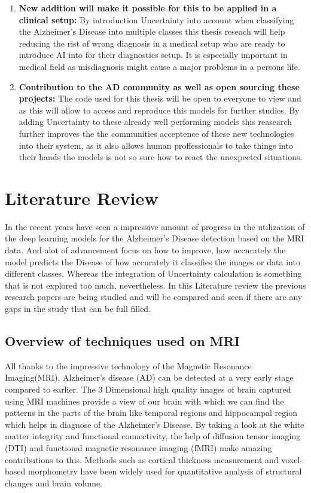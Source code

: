 \documentclass[12pt,onecolumn]{report}
\begin{document}
\begin{enumerate}
    \item \textbf{New addition will make it possible for this to be applied in a clinical setup:} By introduction Uncertainty into account when classifying the Alzheimer’s Disease into multiple classes this thesis reseach will help reducing the rist of wrong diagnosis in a medical setup who are ready to introduce AI into for their diagnostics setup. It is especially important in medical field as misdiagnosis might cause a major problems in a persons life.

    \item \textbf{Contribution to the AD community as well as open sourcing these projects:} The code used for this thesis will be open to everyone to view and as this will allow to access and reproduce this models for further studies. By adding Uncertainty to these already well performing models this reasearch further improves the the communities acceptence of these new technologies into their system, as it also allows human proffessionals to take things into their hands the models is not so sure how to react the unexpected situations.

\end{enumerate}



\chapter{Literature Review}

In the recent years have seen a impressive amount of progress in the utilization of the deep learning models for the Alzheimer’s Disease detection based on the MRI data. And alot of advancement focus on how to improve, how accurately the model predicts the Disease of how accurately it classifies the images or data into different classes. Whereas the integration of Uncertainty calculation is something that is not explored too much, nevertheless. In this Literature review the previous research papers are being studied and will be compared and seen if there are any gaps in the study that can be full filled.

\section{Overview of techniques used on MRI}
All thanks to the impressive technology of the Magnetic Resonance Imaging(MRI), Alzheimer's disease (AD) can be detected at a very early stage compared to earlier. The 3 Dimensional high quality images of brain captured using MRI machines provide a view of our brain with which we can find the patterns in the parts of the brain like temporal regions and hippocampal region which helps in diagnose of the Alzheimer’s Disease. By taking a look at the white matter integrity and functional connectivity, the help of diffusion tensor imaging (DTI) and functional magnetic resonance imaging (fMRI) make amazing contributions to this. Methods such as cortical thickness measurement and voxel-based morphometry have been widely used for quantitative analysis of structural changes and brain volume\cite{zou2023}.
\end{document}
